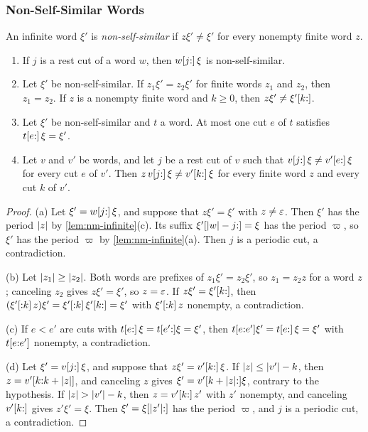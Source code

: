 \subsubsection{Non-Self-Similar Words}

An infinite word $\xi'$ is \emph{non-self-similar} if $z\xi'\ne\xi'$ for every nonempty
finite word $z$.

\begin{lemma}\label{lem:nm-rigid}
\leavevmode
\begin{enumerate}[label=(\alph*)]
\item If $j$ is a rest cut of a word $w$, then $w[j{:}]\,\xi$ is
non-self-similar.
\item Let $\xi'$ be non-self-similar. If $z_1\xi'=z_2\xi'$ for finite words $z_1$ and
$z_2$, then $z_1=z_2$. If $z$ is a nonempty finite word and $k\ge0$, then
$z\xi'\ne\xi'[k{:}]$.
\item Let $\xi'$ be non-self-similar and $t$ a word. At most one cut $e$ of $t$
satisfies $t[e{:}]\,\xi=\xi'$.
\item Let $v$ and $v'$ be words, and let $j$ be a rest cut of $v$ such that
$v[j{:}]\,\xi\ne v'[e{:}]\,\xi$ for every cut $e$ of $v'$. Then
$z\,v[j{:}]\,\xi\ne v'[k{:}]\,\xi$ for every finite word $z$ and every cut $k$
of $v'$.
\end{enumerate}
\end{lemma}

\begin{proof}
(a) Let $\xi'=w[j{:}]\,\xi$, and suppose that $z\xi'=\xi'$ with $z\ne\varepsilon$. Then $\xi'$ has
the period $\lvert z\rvert$ by \cref{lem:nm-infinite}(c). Its suffix
$\xi'[\lvert w\rvert-j{:}]=\xi$ has the period $\varpi$, so $\xi'$ has the period $\varpi$ by
\cref{lem:nm-infinite}(a). Then $j$ is a periodic cut, a contradiction.

(b) Let $\lvert z_1\rvert\ge\lvert z_2\rvert$. Both words are prefixes of $z_1\xi'=z_2\xi'$, so
$z_1=z_2z$ for a word $z$; canceling $z_2$ gives $z\xi'=\xi'$, so $z=\varepsilon$. If
$z\xi'=\xi'[k{:}]$, then $(\xi'[{:}k]\,z)\xi'=\xi'[{:}k]\,\xi'[k{:}]=\xi'$ with $\xi'[{:}k]\,z$
nonempty, a contradiction.

(c) If $e<e'$ are cuts with $t[e{:}]\,\xi=t[e'{:}]\xi=\xi'$, then
$t[e{:}e']\xi'=t[e{:}]\,\xi=\xi'$ with $t[e{:}e']$ nonempty, a contradiction.

(d) Let $\xi'=v[j{:}]\,\xi$, and suppose that $z\xi'=v'[k{:}]\,\xi$. If
$\lvert z\rvert\le\lvert v'\rvert-k$, then $z=v'[k{:}k+\lvert z\rvert]$, and canceling $z$ gives
$\xi'=v'[k+\lvert z\rvert{:}]\xi$, contrary to the hypothesis. If
$\lvert z\rvert>\lvert v'\rvert-k$, then $z=v'[k{:}]\,z'$ with $z'$ nonempty, and canceling
$v'[k{:}]$ gives $z'\xi'=\xi$. Then $\xi'=\xi[\lvert z'\rvert{:}]$ has the period $\varpi$, and
$j$ is a periodic cut, a contradiction.
\end{proof}

